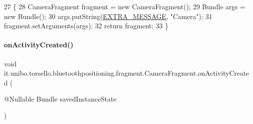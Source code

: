 \begin{DoxyCode}
27                                                \{
28         CameraFragment fragment = \textcolor{keyword}{new} CameraFragment();
29         Bundle args = \textcolor{keyword}{new} Bundle();
30         args.putString(\hyperlink{classit_1_1unibo_1_1torsello_1_1bluetoothpositioning_1_1fragment_1_1CameraFragment_abdda7813302f466435cedfb3641e45b9_abdda7813302f466435cedfb3641e45b9}{EXTRA\_MESSAGE}, \textcolor{stringliteral}{"Camera"});
31         fragment.setArguments(args);
32         \textcolor{keywordflow}{return} fragment;
33     \}
\end{DoxyCode}
\hypertarget{classit_1_1unibo_1_1torsello_1_1bluetoothpositioning_1_1fragment_1_1CameraFragment_a3af6cb206d2194e7d580cf511a97d6f1_a3af6cb206d2194e7d580cf511a97d6f1}{}\label{classit_1_1unibo_1_1torsello_1_1bluetoothpositioning_1_1fragment_1_1CameraFragment_a3af6cb206d2194e7d580cf511a97d6f1_a3af6cb206d2194e7d580cf511a97d6f1} 
\paragraph{\texorpdfstring{on\+Activity\+Created()}{onActivityCreated()}}
{\footnotesize\ttfamily void it.\+unibo.\+torsello.\+bluetoothpositioning.\+fragment.\+Camera\+Fragment.\+on\+Activity\+Created (\begin{DoxyParamCaption}\item[{@Nullable Bundle}]{saved\+Instance\+State }\end{DoxyParamCaption})}


